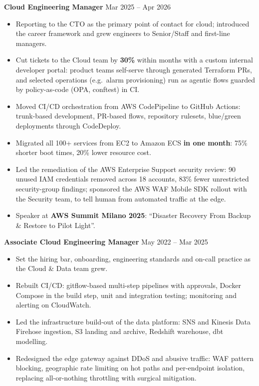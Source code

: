 \documentclass[10pt,a4paper]{article}
\newcommand{\role}[2]{%
  \needspace{6\baselineskip}%
  \vspace{2pt}\textbf{#1} \hfill \textcolor{muted}{#2}\par
}
\begin{document}
\role{Cloud Engineering Manager}{Mar 2025 -- Apr 2026}
\begin{itemize}
  \item Reporting to the CTO as the primary point of contact for cloud; introduced the career framework and grew engineers to Senior/Staff and first-line managers.
  \item Cut tickets to the Cloud team by \textbf{30\%} within months with a custom internal developer portal: product teams self-serve through generated Terraform PRs, and selected operations (e.g.\ alarm provisioning) run as agentic flows guarded by policy-as-code (OPA, conftest) in CI.
  \item Moved CI/CD orchestration from AWS CodePipeline to GitHub Actions: trunk-based development, PR-based flows, repository rulesets, blue/green deployments through CodeDeploy.
  \item Migrated all 100+ services from EC2 to Amazon ECS \textbf{in one month}: 75\% shorter boot times, 20\% lower resource cost.
  \item Led the remediation of the AWS Enterprise Support security review: 90 unused IAM credentials removed across 18 accounts, 83\% fewer unrestricted security-group findings; sponsored the AWS WAF Mobile SDK rollout with the Security team, to tell human from automated traffic at the edge.
  \item Speaker at \textbf{AWS Summit Milano 2025}: ``Disaster Recovery \textemdash{} From Backup \& Restore to Pilot Light''.
\end{itemize}

\role{Associate Cloud Engineering Manager}{May 2022 -- Mar 2025}
\begin{itemize}
  \item Set the hiring bar, onboarding, engineering standards and on-call practice as the Cloud \& Data team grew.
  \item Rebuilt CI/CD: gitflow-based multi-step pipelines with approvals, Docker Compose in the build step, unit and integration testing; monitoring and alerting on CloudWatch.
  \item Led the infrastructure build-out of the data platform: SNS and Kinesis Data Firehose ingestion, S3 landing and archive, Redshift warehouse, dbt modelling.
  \item Redesigned the edge gateway against DDoS and abusive traffic: WAF pattern blocking, geographic rate limiting on hot paths and per-endpoint isolation, replacing all-or-nothing throttling with surgical mitigation.
\end{itemize}
\end{document}
